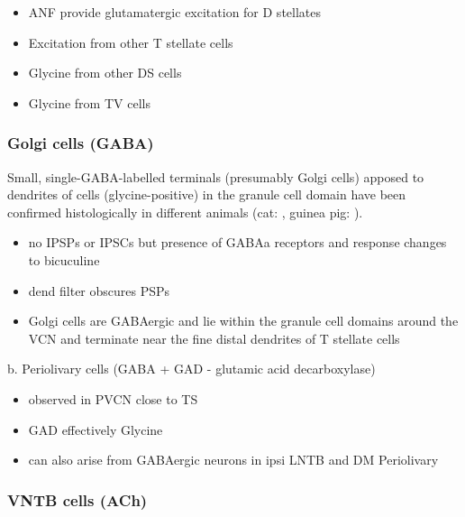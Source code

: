 \begin{itemize}
\item ANF provide glutamatergic excitation for D stellates  \citep{Cant:1981,FerragamoGoldingEtAl:1998a,Alibardi:1998a}
\item Excitation from other T stellate cells \citep{FerragamoGoldingEtAl:1998a}
\item Glycine from other DS cells \citep{FerragamoGoldingEtAl:1998a}
\item Glycine from TV cells \citep{WickesbergOertel:1990,ZhangOertel:1993b}
\end{itemize}

     
\subsubsection{Golgi cells (GABA)}

Small, single-GABA-labelled terminals (presumably Golgi cells) apposed to
dendrites of \DS cells (glycine-positive) in the granule cell domain have been
confirmed histologically in different animals (cat: \citep*{SmithRhode:1989},
guinea pig: \citep*{KolstonOsenEtAl:1992}).


\begin{itemize}
\item no IPSPs or IPSCs but presence of GABAa receptors and response changes to bicuculine \citep{WuOertel:1986,OertelWickesberg:1993,FerragamoGoldingEtAl:1998a}
\item dend filter obscures PSPs
\item Golgi cells are GABAergic and lie within the granule cell domains around the VCN and terminate near the fine distal dendrites of T stellate cells
\end{itemize}

b. Periolivary cells (GABA + GAD - glutamic acid decarboxylase) 

\begin{itemize}
\item observed in PVCN close to TS \citep{AdamsMugnaini:1987}
\item GAD effectively Glycine \citep{GoldingOertel:1997}
\item can also arise from GABAergic neurons in ipsi LNTB and DM Periolivary
\end{itemize}

\subsubsection{VNTB cells (ACh)}

